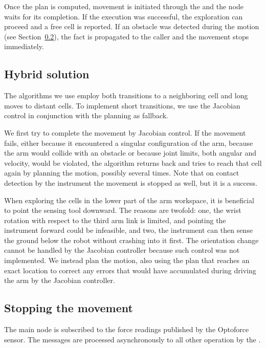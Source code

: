 \documentclass[buriama8_dp.tex]{subfiles}
\begin{document}
Once the plan is computed, movement is initiated through the  and the node waits for its completion. If the execution was successful, the exploration can proceed and a free cell is reported. If an obstacle was detected during the motion (see Section~\ref{subsec:impl_stop}), the fact is propagated to the caller and the movement stops immediately.

\subsection{Hybrid solution}
\label{subsec:impl_drv}


The algorithms we use employ both transitions to a neighboring cell and long moves to distant cells. To implement short transitions, we use the Jacobian control in conjunction with the planning as fallback.

We first try to complete the movement by Jacobian control. If the movement fails, either because it encountered a singular configuration of the arm, because the arm would collide with an obstacle or because joint limits, both angular and velocity, would be violated, the algorithm returns back and tries to reach that cell again by planning the motion, possibly several times. Note that on contact detection by the instrument the movement is stopped as well, but it is a success.

When exploring the cells in the lower part of the arm workspace, it is beneficial to point the sensing tool downward. The reasons are twofold: one, the wrist rotation with respect to the third arm link is limited, and pointing the instrument forward could be infeasible, and two, the instrument can then sense the ground below the robot without crashing into it first. The orientation change cannot be handled by the Jacobian controller because such control was not implemented. We instead plan the motion, also using the plan that reaches an exact location to correct any errors that would have accumulated during driving the arm by the Jacobian controller.

\subsection{Stopping the movement}
\label{subsec:impl_stop}

The main node is subscribed to the force readings published by the Optoforce sensor. The messages are processed asynchronously to all other operation by the .
\end{document}
